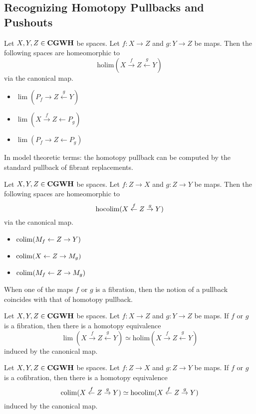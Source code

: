\documentclass[a4paper]{article}
\begin{document}
\subsection{Recognizing Homotopy Pullbacks and Pushouts}
\begin{prp}{}{} Let $X,Y,Z\in\bold{CGWH}$ be spaces. Let $f:X\to Z$ and $g:Y\to Z$ be maps. Then the following spaces are homeomorphic to $$\text{holim}(X\overset{f}{\rightarrow}Z\overset{g}{\leftarrow}Y)$$ via the canonical map. 
\begin{itemize}
\item $\lim(P_f\rightarrow Z\overset{g}{\leftarrow}Y)$
\item $\lim(X\overset{f}{\rightarrow}Z\leftarrow P_g)$
\item $\lim(P_f\rightarrow Z\leftarrow P_g)$
\end{itemize}
\end{prp}

In model theoretic terms: the homotopy pullback can be computed by the standard pullback of fibrant replacements. \\

\begin{prp}{}{} Let $X,Y,Z\in\bold{CGWH}$ be spaces. Let $f:Z\to X$ and $g:Z\to Y$ be maps. Then the following spaces are homeomorphic to $$\operatorname*{hocolim}(X\overset{f}{\leftarrow}Z\overset{g}{\rightarrow}Y)$$ via the canonical map. 
\begin{itemize}
\item $\operatorname*{colim}(M_f\leftarrow Z\rightarrow Y)$
\item $\operatorname*{colim}(X\leftarrow Z\rightarrow M_g)$
\item $\operatorname*{colim}(M_f\leftarrow Z\rightarrow M_g)$
\end{itemize}
\end{prp}

When one of the maps $f$ or $g$ is a fibration, then the notion of a pullback coincides with that of homotopy pullback. 

\begin{prp}{}{} Let $X,Y,Z\in\bold{CGWH}$ be spaces. Let $f:X\to Z$ and $g:Y\to Z$ be maps. If $f$ or $g$ is a fibration, then there is a homotopy equivalence $$\lim(X\overset{f}{\rightarrow}Z\overset{g}{\leftarrow}Y)\simeq\text{holim}(X\overset{f}{\rightarrow}Z\overset{g}{\leftarrow}Y)$$ induced by the canonical map. 
\end{prp}

\begin{prp}{}{} Let $X,Y,Z\in\bold{CGWH}$ be spaces. Let $f:Z\to X$ and $g:Z\to Y$ be maps. If $f$ or $g$ is a cofibration, then there is a homotopy equivalence $$\operatorname*{colim}(X\overset{f}{\leftarrow}Z\overset{g}{\rightarrow}Y)\simeq\text{hocolim}(X\overset{f}{\leftarrow}Z\overset{g}{\rightarrow}Y)$$ induced by the canonical map. 
\end{prp}
\end{document}
